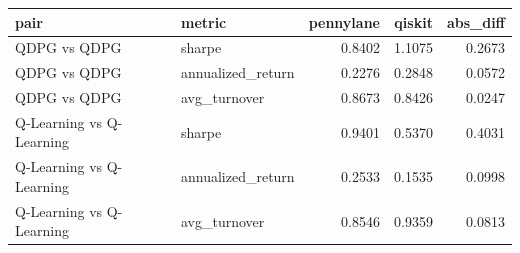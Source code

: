 \begin{tabular}{llrrr}
\toprule
pair & metric & pennylane & qiskit & abs_diff \\
\midrule
QDPG vs QDPG & sharpe & 0.8402 & 1.1075 & 0.2673 \\
QDPG vs QDPG & annualized_return & 0.2276 & 0.2848 & 0.0572 \\
QDPG vs QDPG & avg_turnover & 0.8673 & 0.8426 & 0.0247 \\
Q-Learning vs Q-Learning & sharpe & 0.9401 & 0.5370 & 0.4031 \\
Q-Learning vs Q-Learning & annualized_return & 0.2533 & 0.1535 & 0.0998 \\
Q-Learning vs Q-Learning & avg_turnover & 0.8546 & 0.9359 & 0.0813 \\
\bottomrule
\end{tabular}
